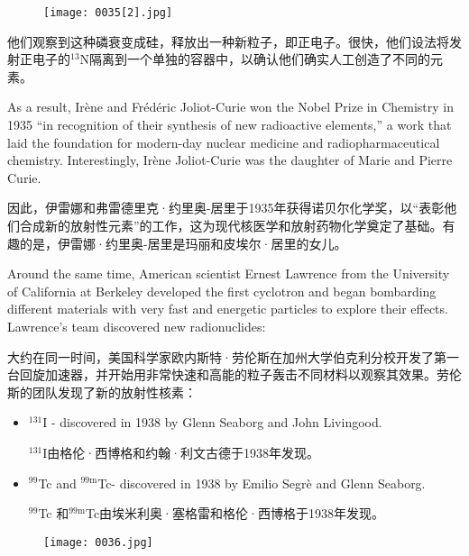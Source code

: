 \documentclass[dvipsnames, svgnames,a4paper,11pt]{article}
\begin{document}
\begin{figure}[htbp]
      \centering
      \texttt{[image: 0035[2].jpg]}
       \label{fig25}
\end{figure}

他们观察到这种磷衰变成硅，释放出一种新粒子，即正电子。很快，他们设法将发射正电子的${}^{13}$N隔离到一个单独的容器中，以确认他们确实人工创造了不同的元素。

As a result, Irène and Frédéric Joliot-Curie won the Nobel Prize in Chemistry in 1935 “in recognition of their synthesis of new radioactive elements,” a work that laid the foundation for modern-day nuclear medicine and radiopharmaceutical chemistry. Interestingly, Irène Joliot-Curie was the daughter of Marie and Pierre Curie.

因此，伊雷娜和弗雷德里克·约里奥-居里于1935年获得诺贝尔化学奖，以“表彰他们合成新的放射性元素”的工作，这为现代核医学和放射药物化学奠定了基础。有趣的是，伊雷娜·约里奥-居里是玛丽和皮埃尔·居里的女儿。

Around the same time, American scientist Ernest Lawrence from the University of California at Berkeley developed the first cyclotron and began bombarding different materials with very fast and energetic particles to explore their effects. Lawrence’s team discovered new radionuclides:

大约在同一时间，美国科学家欧内斯特·劳伦斯在加州大学伯克利分校开发了第一台回旋加速器，并开始用非常快速和高能的粒子轰击不同材料以观察其效果。劳伦斯的团队发现了新的放射性核素：

\begin{itemize}
      \item ${}^{131}$I - discovered in 1938 by Glenn Seaborg and John Livingood.

            ${}^{131}$I由格伦·西博格和约翰·利文古德于1938年发现。

      \item ${}^{99}$Tc and ${}^\text{99m}$Tc- discovered in 1938 by Emilio Segrè and Glenn Seaborg.

            ${}^{99}$Tc 和${}^\text{99m}$Tc由埃米利奥·塞格雷和格伦·西博格于1938年发现。

\end{itemize}

\begin{figure}[htbp]
      \centering
      \texttt{[image: 0036.jpg]}
       \label{fig26}
\end{figure}
\end{document}
